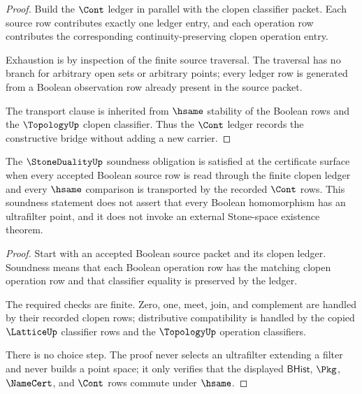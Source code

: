 \begin{proof}
Build the $\Cont$ ledger in parallel with the clopen classifier packet. Each source row contributes exactly one ledger entry, and each operation row contributes the corresponding continuity-preserving clopen operation entry.

Exhaustion is by inspection of the finite source traversal. The traversal has no branch for arbitrary open sets or arbitrary points; every ledger row is generated from a Boolean observation row already present in the source packet.

The transport clause is inherited from $\hsame$ stability of the Boolean rows and the $\TopologyUp$ clopen classifier. Thus the $\Cont$ ledger records the constructive bridge without adding a new carrier.
\end{proof}

\begin{theorem}\label{thm:stoneduality-ultrafilter-free-soundness}
The $\StoneDualityUp$ soundness obligation is satisfied at the certificate surface when every accepted Boolean source row is read through the finite clopen ledger and every $\hsame$ comparison is transported by the recorded $\Cont$ rows. This soundness statement does not assert that every Boolean homomorphism has an ultrafilter point, and it does not invoke an external Stone-space existence theorem.
\end{theorem}

\begin{proof}
Start with an accepted Boolean source packet and its clopen ledger. Soundness means that each Boolean operation row has the matching clopen operation row and that classifier equality is preserved by the ledger.

The required checks are finite. Zero, one, meet, join, and complement are handled by their recorded clopen rows; distributive compatibility is handled by the copied $\LatticeUp$ classifier rows and the $\TopologyUp$ operation classifiers.

There is no choice step. The proof never selects an ultrafilter extending a filter and never builds a point space; it only verifies that the displayed $\mathsf{BHist}$, $\Pkg$, $\NameCert$, and $\Cont$ rows commute under $\hsame$.
\end{proof}

